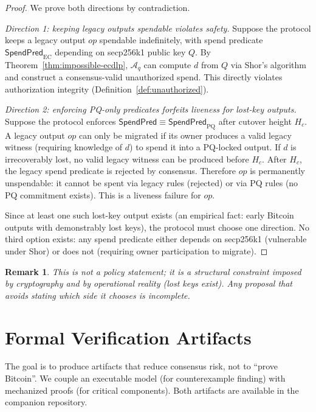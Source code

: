 \documentclass[11pt]{article}
\newtheorem{remark}{Remark}
\newcommand{\Aq}{\mathcal{A}_q}
\newcommand{\SpendPred}{\mathsf{SpendPred}}
\newcommand{\SpendPredPQ}{\SpendPred_{\mathrm{PQ}}}
\newcommand{\SpendPredEC}{\SpendPred_{\mathrm{EC}}}
\begin{document}
\begin{proof}
We prove both directions by contradiction.

\emph{Direction 1: keeping legacy outputs spendable violates safety.}
Suppose the protocol keeps a legacy output $op$ spendable indefinitely, with spend predicate $\SpendPredEC$ depending on secp256k1 public key $Q$.
By Theorem~\ref{thm:impossible-ecdlp}, $\Aq$ can compute $d$ from $Q$ via Shor's algorithm and construct a consensus-valid unauthorized spend.
This directly violates authorization integrity (Definition~\ref{def:unauthorized}).

\emph{Direction 2: enforcing PQ-only predicates forfeits liveness for lost-key outputs.}
Suppose the protocol enforces $\SpendPred\equiv\SpendPredPQ$ after cutover height $H_c$.
A legacy output $op$ can only be migrated if its owner produces a valid legacy witness (requiring knowledge of $d$) to spend it into a PQ-locked output.
If $d$ is irrecoverably lost, no valid legacy witness can be produced before $H_c$.
After $H_c$, the legacy spend predicate is rejected by consensus.
Therefore $op$ is permanently unspendable: it cannot be spent via legacy rules (rejected) or via PQ rules (no PQ commitment exists).
This is a liveness failure for $op$.

Since at least one such lost-key output exists (an empirical fact: early Bitcoin outputs with demonstrably lost keys), the protocol must choose one direction.
No third option exists: any spend predicate either depends on secp256k1 (vulnerable under Shor) or does not (requiring owner participation to migrate).
\end{proof}

\begin{remark}
This is not a policy statement; it is a structural constraint imposed by cryptography and by operational reality (lost keys exist).
Any proposal that avoids stating which side it chooses is incomplete.
\end{remark}

\section{Formal Verification Artifacts}\label{sec:formal}

The goal is to produce artifacts that reduce consensus risk, not to ``prove Bitcoin''.
We couple an executable model (for counterexample finding) with mechanized proofs (for critical components).
Both artifacts are available in the companion repository.
\end{document}
